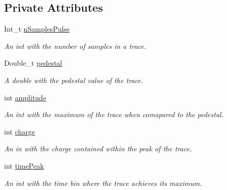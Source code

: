 \subsection*{Private Attributes}
\begin{DoxyCompactItemize}
\item 
\mbox{\label{classPulse_aa12830521e153112820bc6ee0b5c5017}} 
Int\+\_\+t \hyperlink{classPulse_aa12830521e153112820bc6ee0b5c5017}{n\+Samples\+Pulse}
\begin{DoxyCompactList}\small\item\em An int with the number of samples in a trace. \end{DoxyCompactList}\item 
\mbox{\label{classPulse_ab3afb498afb4eca2b6c6d0dd9dd51bec}} 
Double\+\_\+t \hyperlink{classPulse_ab3afb498afb4eca2b6c6d0dd9dd51bec}{pedestal}
\begin{DoxyCompactList}\small\item\em A double with the pedestal value of the trace. \end{DoxyCompactList}\item 
\mbox{\label{classPulse_a866843d06db2db2900ecfac5c7d5cfe7}} 
int \hyperlink{classPulse_a866843d06db2db2900ecfac5c7d5cfe7}{amplitude}
\begin{DoxyCompactList}\small\item\em An int with the maximum of the trace when comapared to the pedestal. \end{DoxyCompactList}\item 
\mbox{\label{classPulse_a229bdafb47630796a5df185971872d4e}} 
int \hyperlink{classPulse_a229bdafb47630796a5df185971872d4e}{charge}
\begin{DoxyCompactList}\small\item\em An in with the charge contained within the peak of the trace. \end{DoxyCompactList}\item 
\mbox{\label{classPulse_a6cd30f26434ed4ddf212fb56ec5bceff}} 
int \hyperlink{classPulse_a6cd30f26434ed4ddf212fb56ec5bceff}{time\+Peak}
\begin{DoxyCompactList}\small\item\em An int with the time bin where the trace achieves its maximum. \end{DoxyCompactList}\item 

\end{DoxyCompactItemize}
